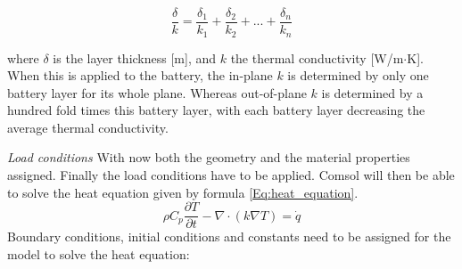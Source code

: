 \begin{equation}
\label{Eq:thermal_conductivity}
\frac{\delta}{k} = \frac{\delta_1}{k_1} + \frac{\delta_2}{k_2} + ... +\frac{\delta_n}{k_n}
\end{equation}

where $\delta$ is the layer thickness [m], and $k$ the thermal conductivity [W/m$\cdot$K]. \\When this is applied to the battery, the in-plane $k$ is determined by only one battery layer for its whole plane. Whereas out-of-plane $k$ is determined by a hundred fold times this battery layer, with each battery layer decreasing the average thermal conductivity.

\textit{Load conditions}\newline
With now both the geometry and the material properties assigned. Finally the load conditions have to be applied. Comsol will then be able to solve the heat equation given by formula \ref{Eq:heat_equation}.
\begin{equation}
\label{Eq:heat_equation}
\rho C_p \dfrac{\partial T}{\partial t} - \nabla \cdot (k\nabla T) = \dot{q}
\end{equation}
Boundary conditions, initial conditions and constants need to be assigned for the model to solve the heat equation:
